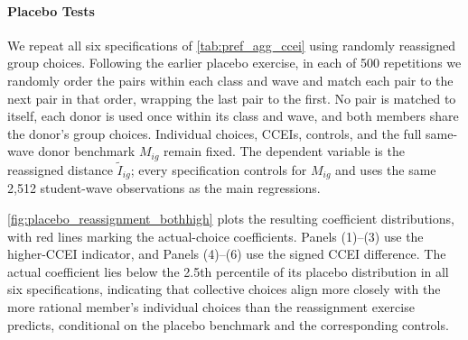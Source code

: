 \documentclass[11 pt]{article}
\begin{document}
\paragraph{Placebo Tests} We repeat all six specifications of \autoref{tab:pref_agg_ccei} using randomly reassigned group choices. Following the earlier placebo exercise, in each of 500 repetitions we randomly order the pairs within each class and wave and match each pair to the next pair in that order, wrapping the last pair to the first. No pair is matched to itself, each donor is used once within its class and wave, and both members share the donor's group choices. Individual choices, CCEIs, controls, and the full same-wave donor benchmark $M_{ig}$ remain fixed. The dependent variable is the reassigned distance $\widetilde I_{ig}$; every specification controls for $M_{ig}$ and uses the same 2,512 student-wave observations as the main regressions.

\autoref{fig:placebo_reassignment_bothhigh} plots the resulting coefficient distributions, with red lines marking the actual-choice coefficients. Panels (1)--(3) use the higher-CCEI indicator, and Panels (4)--(6) use the signed CCEI difference. The actual coefficient lies below the 2.5th percentile of its placebo distribution in all six specifications, indicating that collective choices align more closely with the more rational member's individual choices than the reassignment exercise predicts, conditional on the placebo benchmark and the corresponding controls.
\end{document}
